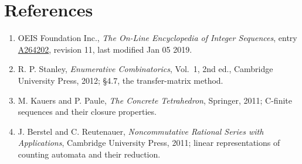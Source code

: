 \documentclass[11pt]{article}
\theoremstyle{definition}
\begin{document}
\section{References}

\begin{enumerate}

\item OEIS Foundation Inc., \emph{The On-Line Encyclopedia of Integer Sequences}, entry \href{https://oeis.org/A264202}{A264202}, revision 11, last modified Jan 05 2019.

\item R. P. Stanley, \emph{Enumerative Combinatorics}, Vol.~1, 2nd ed., Cambridge University Press, 2012; \S4.7, the transfer-matrix method.

\item M. Kauers and P. Paule, \emph{The Concrete Tetrahedron}, Springer, 2011; C-finite sequences and their closure properties.

\item J. Berstel and C. Reutenauer, \emph{Noncommutative Rational Series with Applications}, Cambridge University Press, 2011; linear representations of counting automata and their reduction.

\end{enumerate}
\end{document}
